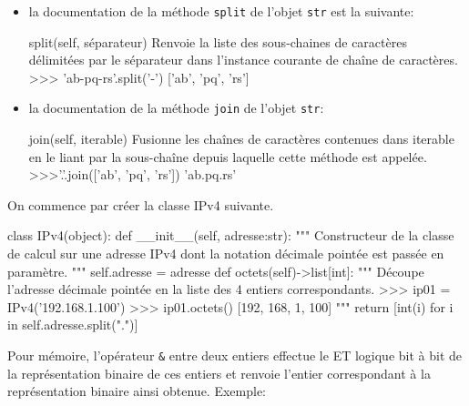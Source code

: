\begin{itemize}
    \item la documentation de la méthode \verb|split| de l'objet \verb|str| est la suivante:
\begin{CodePythontexAlt}[TaillePolice=\large, Largeur=1\linewidth,Centre,Lignes=true,PremLigne=1]{}
    split(self, séparateur) 
        Renvoie la liste des sous-chaines de caractères délimitées par 
        le séparateur dans l'instance courante de chaîne de caractères. 
        >>> 'ab-pq-rs'.split('-') 
        ['ab', 'pq', 'rs']
    \end{CodePythontexAlt}

    \medskip

    \item la documentation de la méthode \verb|join| de l'objet \verb|str|:
\begin{CodePythontexAlt}[TaillePolice=\large, Largeur=1\linewidth,Centre,Lignes=true,PremLigne=1]{}
    join(self, iterable) 
        Fusionne les chaînes de caractères contenues dans iterable en 
        le liant par la sous-chaîne depuis laquelle cette méthode est appelée. 
        >>>'.'.join(['ab', 'pq', 'rs']) 
        'ab.pq.rs'
    \end{CodePythontexAlt}

\end{itemize}

On commence par créer la classe IPv4 suivante.

\begin{CodePythontexAlt}[TaillePolice=\large, Largeur=1\linewidth,Centre,Lignes=true,PremLigne=1]{}
class IPv4(object):
    def __init__(self, adresse:str):
        """ Constructeur de la classe de calcul sur une adresse IPv4 
        dont la notation décimale pointée est passée en paramètre. """
        self.adresse = adresse
    def octets(self)->list[int]:
        """ Découpe l'adresse décimale pointée en la liste des 4 entiers 
        correspondants. 
        >>> ip01 = IPv4('192.168.1.100')
        >>> ip01.octets()
        [192, 168, 1, 100]        """
        return [int(i) for i in self.adresse.split(".")]

   \end{CodePythontexAlt}

\medskip

   Pour mémoire, l'opérateur \texttt{\&} entre deux entiers effectue le ET logique bit à bit de la représentation binaire de ces entiers et renvoie l'entier correspondant à la représentation binaire ainsi obtenue. Exemple:
   
